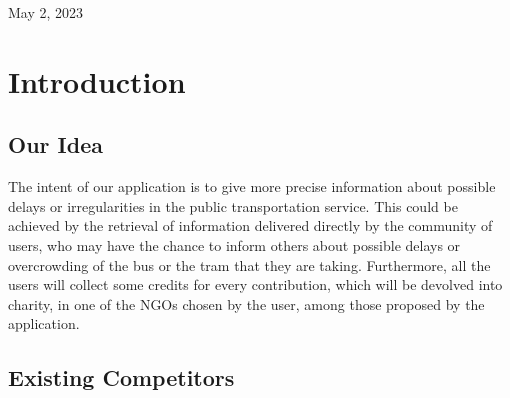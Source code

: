 \documentclass[a4paper, 11pt]{report}
\begin{document}
\begin{titlepage}


	\vfill\vfill\vfill %

	{\large May 2, 2023} %




	\vfill %

\end{titlepage}

\tableofcontents

\chapter{Introduction}
\section{Our Idea}\label{sec:our-idea}
The intent of our application is to give more precise information about possible delays or irregularities in the public transportation service. This could be achieved by the retrieval of information delivered directly by the community of users, who may have the chance to inform others about possible delays or overcrowding of the bus or the tram that they are taking.
Furthermore, all the users will collect some credits for every contribution, which will be devolved into charity, in one of the NGOs chosen by the user, among those proposed by the application.

\section{Existing Competitors}\label{sec:existing-competitors}
\end{document}
